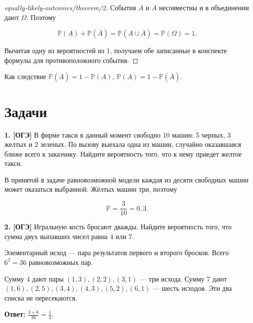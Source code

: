 \begin{proof}[equally-likely-outcomes/theorem/2]\label{solution-equally-likely-outcomes-theorem-2}
События $A$ и $\overline A$ несовместны и в объединении дают $\Omega$. Поэтому

\[\mathbb P(A)+\mathbb P(\overline A)=\mathbb P(A\cup\overline A)=\mathbb P(\Omega)=1.\]

Вычитая одну из вероятностей из 1, получаем обе записанные в конспекте формулы для противоположного события.
\end{proof}

Как следствие $\mathbb{P}(\overline{A}) = 1 - \mathbb{P}(A),\ \mathbb{P}(A) = 1 - \mathbb{P}(\overline{A})$.

\section{Задачи}

\begin{task}\label{task-problems-1}
\textbf{1. [ОГЭ]} В фирме такси в данный момент свободно 10 машин: 5 черных, 3 желтых и 2 зеленых. По вызову выехала одна из машин, случайно оказавшаяся ближе всего к заказчику. Найдите вероятность того, что к нему приедет желтое такси.
\end{task}

\begin{solution}\label{solution-equally-likely-outcomes-problems-1}
В принятой в задаче равновозможной модели каждая из десяти свободных машин может оказаться выбранной. Жёлтых машин три, поэтому

\[\mathbb P=\frac3{10}=0,3.\]
\end{solution}

\begin{task}\label{task-problems-2}
\textbf{2. [ОГЭ]} Игральную кость бросают дважды. Найдите вероятность того, что сумма двух выпавших чисел равна 4 или 7.
\end{task}

\begin{solution}\label{solution-equally-likely-outcomes-problems-2}
Элементарный исход — пара результатов первого и второго бросков. Всего $6^2=36$ равновозможных пар.

Сумму 4 дают пары $(1,3),(2,2),(3,1)$ — три исхода. Сумму 7 дают $(1,6),(2,5),(3,4),(4,3),(5,2),(6,1)$ — шесть исходов. Эти два списка не пересекаются.

\textbf{Ответ:} $\frac{3+6}{36}=\frac14$.
\end{solution}

